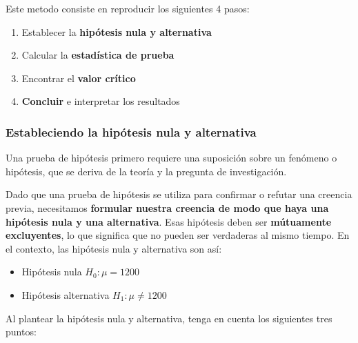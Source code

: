 \documentclass[
]{book}
\providecommand{\tightlist}{%
  \setlength{\itemsep}{0pt}\setlength{\parskip}{0pt}}
\begin{document}
Este metodo consiste en reproducir los siguientes 4 pasos:

\begin{enumerate}
\def\labelenumi{\arabic{enumi}.}
\tightlist
\item
  Establecer la \textbf{hipótesis nula y alternativa}
\item
  Calcular la \textbf{estadística de prueba}
\item
  Encontrar el \textbf{valor crítico}
\item
  \textbf{Concluir} e interpretar los resultados
\end{enumerate}

\hypertarget{estableciendo-la-hipuxf3tesis-nula-y-alternativa}{%
\subsubsection{Estableciendo la hipótesis nula y alternativa}\label{estableciendo-la-hipuxf3tesis-nula-y-alternativa}}

Una prueba de hipótesis primero requiere una suposición sobre un fenómeno o hipótesis, que se deriva de la teoría y la pregunta de investigación.

Dado que una prueba de hipótesis se utiliza para confirmar o refutar una creencia previa, necesitamos \textbf{formular nuestra creencia de modo que haya una hipótesis nula y una alternativa}. Esas hipótesis deben ser \textbf{mútuamente excluyentes}, lo que significa que no pueden ser verdaderas al mismo tiempo. En el contexto, las hipótesis nula y alternativa son así:

\begin{itemize}
\tightlist
\item
  Hipótesis nula \(H_0:\mu=1200\)
\item
  Hipótesis alternativa \(H_1:\mu\ne 1200\)
\end{itemize}

Al plantear la hipótesis nula y alternativa, tenga en cuenta los siguientes tres puntos:
\end{document}
